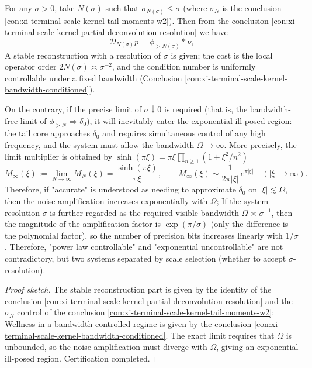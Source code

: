 \begin{conclusion}\label{con:xi-terminal-scale-kernel-two-regime-recoverability}
For any \(\sigma>0\), take \(N(\sigma)\) such that \(\sigma_{N(\sigma)}\le\sigma\) (where \(\sigma_N\) is the conclusion \ref{con:xi-terminal-scale-kernel-tail-moments-w2}).
Then from the conclusion \ref{con:xi-terminal-scale-kernel-partial-deconvolution-resolution} we have
\[
\mathcal D_{N(\sigma)}p=\phi_{>N(\sigma)}*\nu,
\]
A stable reconstruction with a resolution of \(\sigma\) is given; the cost is the local operator order \(2N(\sigma)\asymp\sigma^{-2}\), and the condition number is uniformly controllable under a fixed bandwidth (Conclusion \ref{con:xi-terminal-scale-kernel-bandwidth-conditioned}).
\par
On the contrary, if the precise limit of \(\sigma\downarrow 0\) is required (that is, the bandwidth-free limit of \(\phi_{>N}\Rightarrow\delta_0\)), it will inevitably enter the exponential ill-posed region: the tail core approaches \(\delta_0\) and requires simultaneous control of any high frequency, and the system must allow the bandwidth \(\Omega\to\infty\).
More precisely, the limit multiplier is obtained by \(\sinh(\pi\xi)=\pi\xi\prod_{n\ge 1}(1+\xi^2/n^2)\)
\[
M_\infty(\xi):=\lim_{N\to\infty}M_N(\xi)=\frac{\sinh(\pi\xi)}{\pi\xi},
\qquad
M_\infty(\xi)\sim \frac{1}{2\pi|\xi|}\,e^{\pi|\xi|}\quad(|\xi|\to\infty).
\]
Therefore, if "accurate" is understood as needing to approximate \(\delta_0\) on \(|\xi|\lesssim \Omega\), then the noise amplification increases exponentially with \(\Omega\);
If the system resolution \(\sigma\) is further regarded as the required visible bandwidth \(\Omega\asymp \sigma^{-1}\), then the magnitude of the amplification factor is \(\exp(\pi/\sigma)\) (only the difference is the polynomial factor), so the number of precision bits increases linearly with \(1/\sigma\).
Therefore, "power law controllable" and "exponential uncontrollable" are not contradictory, but two systems separated by scale selection (whether to accept \(\sigma\)-resolution).
\end{conclusion}
\begin{proof}[Proof sketch]
The stable reconstruction part is given by the identity of the conclusion \ref{con:xi-terminal-scale-kernel-partial-deconvolution-resolution} and the \(\sigma_N\) control of the conclusion \ref{con:xi-terminal-scale-kernel-tail-moments-w2};
Wellness in a bandwidth-controlled regime is given by the conclusion \ref{con:xi-terminal-scale-kernel-bandwidth-conditioned}.
The exact limit requires that \(\Omega\) is unbounded, so the noise amplification must diverge with \(\Omega\), giving an exponential ill-posed region. Certification completed.
\end{proof}

